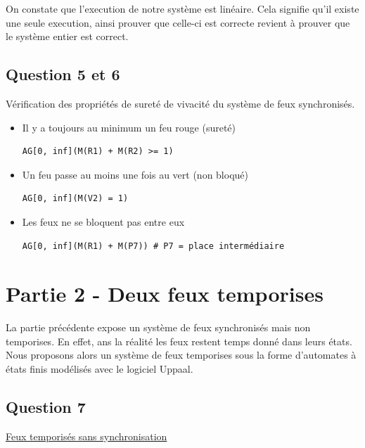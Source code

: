 \documentclass[11pt]{article}
\begin{document}
On constate que l'execution de notre système est linéaire. Cela signifie qu'il existe une seule execution, ainsi prouver que celle-ci est correcte revient à prouver que le système entier est correct.

\subsection{Question 5 et 6}

Vérification des propriétés de sureté de vivacité du système de feux synchronisés.

\begin{itemize}
	\item Il y a toujours au minimum un feu rouge (sureté)
\begin{verbatim}
AG[0, inf](M(R1) + M(R2) >= 1)	
\end{verbatim}

	\item Un feu passe au moins une fois au vert (non bloqué)
\begin{verbatim}
AG[0, inf](M(V2) = 1)	
\end{verbatim}

	\item Les feux ne se bloquent pas entre eux
\begin{verbatim}
AG[0, inf](M(R1) + M(P7)) # P7 = place intermédiaire	
\end{verbatim}
\end{itemize}

\section{Partie 2 - Deux feux temporises}
La partie précédente expose un système de feux synchronisés mais non temporises. En effet, ans la réalité les feux restent temps donné dans leurs états. Nous proposons alors un système de feux temporises sous la forme d'automates à états finis modélisés avec le logiciel Uppaal.

\subsection{Question 7}

\href{https://github.com/masters-info-nantes/hong-cheng-lv/blob/master/ressources/part2/Q7-FeuxTemporises.xml}{Feux temporisés sans synchronisation}
\end{document}
